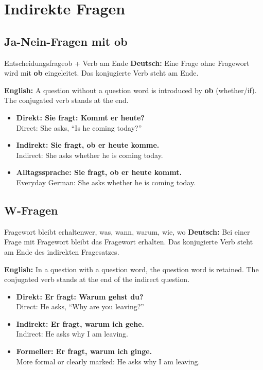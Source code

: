 \documentclass[a4paper,11pt]{article}
\newcommand{\GermanText}[1]{\textbf{Deutsch: }#1\par}
\newcommand{\EnglishText}[1]{{\small\color{SoftGray}\textbf{English: }#1\par}}
\newcommand{\ExampleItem}[2]{\item \textbf{#1}\\{\small\color{SoftGray}#2}}
\begin{document}
    \section{Indirekte Fragen}

        \subsection{Ja-Nein-Fragen mit \glqq ob\grqq}

            \begin{grammarentry}{Entscheidungsfrage}{ob + Verb am Ende}
                \GermanText{Eine Frage ohne Fragewort wird mit \textbf{ob} eingeleitet. Das konjugierte Verb steht am Ende.}
                \EnglishText{A question without a question word is introduced by \textbf{ob} (whether/if). The conjugated verb stands at the end.}
            \end{grammarentry}

            \begin{exbox}
                \begin{itemize}
                    \ExampleItem{Direkt: Sie fragt: \glqq Kommt er heute?\grqq}{Direct: She asks, ``Is he coming today?''}
                    \ExampleItem{Indirekt: Sie fragt, ob er heute komme.}{Indirect: She asks whether he is coming today.}
                    \ExampleItem{Alltagssprache: Sie fragt, ob er heute kommt.}{Everyday German: She asks whether he is coming today.}
                \end{itemize}
            \end{exbox}

        \subsection{W-Fragen}

            \begin{grammarentry}{Fragewort bleibt erhalten}{wer, was, wann, warum, wie, wo}
                \GermanText{Bei einer Frage mit Fragewort bleibt das Fragewort erhalten. Das konjugierte Verb steht am Ende des indirekten Fragesatzes.}
                \EnglishText{In a question with a question word, the question word is retained. The conjugated verb stands at the end of the indirect question.}
            \end{grammarentry}

            \begin{exbox}
                \begin{itemize}
                    \ExampleItem{Direkt: Er fragt: \glqq Warum gehst du?\grqq}{Direct: He asks, ``Why are you leaving?''}
                    \ExampleItem{Indirekt: Er fragt, warum ich gehe.}{Indirect: He asks why I am leaving.}
                    \ExampleItem{Formeller: Er fragt, warum ich ginge.}{More formal or clearly marked: He asks why I am leaving.}
                \end{itemize}
            \end{exbox}
\end{document}
